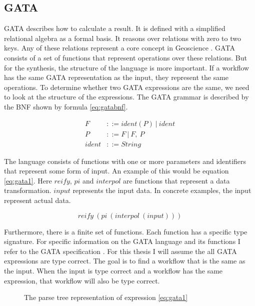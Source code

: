 \documentclass{article}
\begin{document}


\subsection{GATA}
GATA describes how to calculate a result. It is defined with a simplified relational algebra as a formal basis. It reasons over relations with zero to two keys. Any of these relations represent a core concept in Geoscience \cite{kuhn2012core}. GATA consists of a set of functions that represent operations over these relations. 
But for the synthesis, the structure of the language is more important. If a workflow has the same GATA representation as the input, they represent the same operations. To determine whether two GATA expressions are the same, we need to look at the structure of the expressions. The GATA grammar is described by the BNF shown by formula \ref{eq:gatabnf}. 


\begin{align}
    F &::= ident(P)\ |\ ident  \nonumber \\
    P &::= F\ |\ F,\ P \nonumber \\
    ident &::= String \label{eq:gatabnf}
\end{align}

The language consists of functions with one or more parameters and identifiers that represent some form of input. An example of this would be equation \ref{eq:gata1}. Here $reify$, $pi$ and $interpol$ are functions that represent a data transformation. $input$ represents the input data. In concrete examples, the input represent actual data. 

\begin{equation}
    reify\ (pi\ (interpol\ (input))) \label{eq:gata1}
\end{equation}

Furthermore, there is a finite set of functions. Each function has a specific type signature. For specific information on the GATA language and its functions I refer to the GATA specification \cite{scheider2020gata}. For this thesis I will assume the all GATA expressions are type correct. The goal is to find a workflow that is the same as the input. When the input is type correct and a workflow has the same expression, that workflow will also be type correct. 

\begin{figure}
    \centering
   
    
    \caption{The parse tree representation of expression \ref{eq:gata1}}
    \label{fig:parsetree}
\end{figure}
\end{document}

